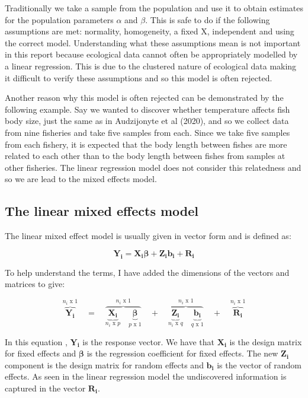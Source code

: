 \documentclass{article}
\begin{document}
Traditionally we take a sample from the population and use it to obtain estimates for the population parameters $\alpha$ and $\beta$. This is safe to do if the following assumptions are met: normality, homogeneity, a fixed X, independent and using the correct model. Understanding what these assumptions mean is not important in this report because ecological data cannot often be appropriately modelled by a linear regression. This is due to the clustered nature of ecological data making it difficult to verify these assumptions and so this model is often rejected.

Another reason why this model is often rejected can be demonstrated by the following example. Say we wanted to discover whether temperature affects fish body size, just the same as in Audzijonyte et al (2020), and so we collect data from nine fisheries and take five samples from each. Since we take five samples from each fishery, it is expected that the body length between fishes are more related to each other than to the body length between fishes from samples at other fisheries. The linear regression model does not consider this relatedness \cite{13} and so we are lead to the mixed effects model. 

\subsection{The linear mixed effects model}

The linear mixed effect model is usually given in vector form and is defined as:

\[
\mathbf{Y_i} =
\mathbf{X_i {\boldsymbol\beta}} + 
\mathbf{Z_i b_i} + 
\mathbf{R_i}
\]

To help understand the terms, I have added the dimensions of the vectors and matrices to give:

\[
\overbrace{\mathbf{Y_i}}^{\mbox{$n_i$ x 1}}
\quad = \quad
\overbrace{\underbrace{\mathbf{X_i}}_{\mbox{$n_i$ x $p$}} \quad
\underbrace{\boldsymbol{\beta}}_{\mbox{$p$ x 1}}}^{\mbox{$n_i$ x 1}} 
\quad + \quad
\overbrace{\underbrace{\mathbf{Z_i}}_{\mbox{$n_i$ x $q$}} \quad
\underbrace{\mathbf{b_i}}_{\mbox{$q$ x 1}}}^{\mbox{$n_i$ x 1}}
\quad + \quad
\overbrace{\mathbf{R_i}}^{\mbox{$n_i$ x 1}}
\]

In this equation \cite{14}, $\mathbf{Y_i}$ is the response vector. We have that $\mathbf{X_i}$ is the design matrix for fixed effects and $\boldsymbol{\beta}$ is the regression coefficient for fixed effects. The new $\mathbf{Z_i}$ component is the design matrix for random effects and $\mathbf{b_i}$ is the vector of random effects. As seen in the linear regression model the undiscovered information is captured in the vector $\mathbf{R_i}$.
\end{document}
